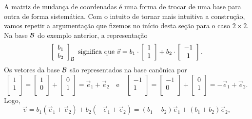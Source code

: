 \documentclass[../livro.tex]{subfiles}  %
\begin{document}
\begin{remark}
	A matriz de mudança de coordenadas é uma forma de trocar de uma base para outra de forma sistemática. Com o intuito de tornar mais intuitiva a construção, vamos repetir a argumentação que fizemos no início desta seção para o caso $2\times 2$. Na base $\mathcal{B}$ do exemplo anterior, a representação
	\[
	\left[
	\begin{array}{c}
	b_1 \\
	b_2 \\
	\end{array}
	\right]_{\mathcal{B}} \text{ significa que } \vec{v} = b_1 \cdot \left[
	\begin{array}{c}
	1 \\
	1 \\
	\end{array}
	\right] + b_2 \cdot 
	\left[
	\begin{array}{c}
	-1 \\
	1 \\
	\end{array}
	\right].
	\] Os vetores da base $\mathcal{B}$ são representados na base canônica por
	\[
	\left[
	\begin{array}{c}
	1 \\
	1 \\
	\end{array}
	\right] = 
	\left[
	\begin{array}{c}
	1 \\
	0 \\
	\end{array}
	\right] + 
	\left[
	\begin{array}{c}
	0 \\
	1 \\
	\end{array}
	\right] = \vec{e}_1 + \vec{e}_2 \quad \text{e} \quad 
	\left[
	\begin{array}{c}
	-1 \\
	1 \\
	\end{array}
	\right] =
	\left[
	\begin{array}{c}
	-1 \\
	0 \\
	\end{array}
	\right] +
	\left[
	\begin{array}{c}
	0 \\
	1 \\
	\end{array}
	\right] = - \vec{e}_1 + \vec{e}_2.
	\] Logo,
	\[
	\vec{v} = b_1 \left(  \vec{e}_1 + \vec{e}_2 \right) + b_2 \left(  - \vec{e}_1 + \vec{e}_2  \right) = (b_1 - b_2) \vec{e}_1 + (b_1 + b_2) \vec{e}_2,
\]
\end{remark}
\end{document}

